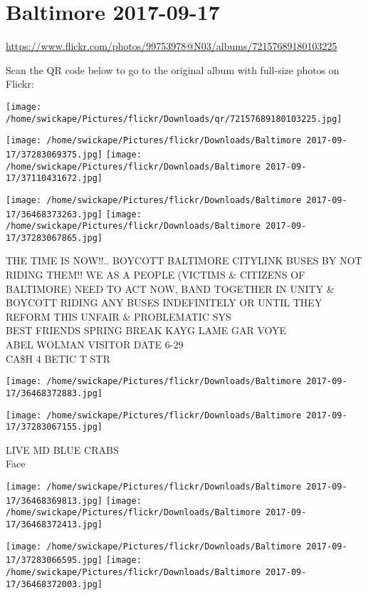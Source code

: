 \documentclass[10pt,letterpaper]{article}
\begin{document}
\section*{Baltimore 2017-09-17}

\url{https://www.flickr.com/photos/99753978@N03/albums/72157689180103225}

Scan the QR code below to go to the original album with full-size photos on Flickr:

\texttt{[image: /home/swickape/Pictures/flickr/Downloads/qr/72157689180103225.jpg]}
\pagebreak

\texttt{[image: /home/swickape/Pictures/flickr/Downloads/Baltimore 2017-09-17/37283069375.jpg]}
\texttt{[image: /home/swickape/Pictures/flickr/Downloads/Baltimore 2017-09-17/37110431672.jpg]}

\texttt{[image: /home/swickape/Pictures/flickr/Downloads/Baltimore 2017-09-17/36468373263.jpg]}
\texttt{[image: /home/swickape/Pictures/flickr/Downloads/Baltimore 2017-09-17/37283067865.jpg]}

THE TIME IS NOW!!..  BOYCOTT BALTIMORE CITYLINK BUSES BY NOT RIDING THEM!!  WE AS A PEOPLE (VICTIMS \& CITIZENS OF BALTIMORE) NEED TO ACT NOW, BAND TOGETHER IN UNITY \& BOYCOTT RIDING ANY BUSES INDEFINITELY OR UNTIL THEY REFORM THIS UNFAIR \& PROBLEMATIC SYS\\
BEST FRIENDS SPRING BREAK KAYG LAME GAR VOYE\\
ABEL WOLMAN VISITOR DATE 6{-}29\\
CA\$H 4 BETIC T STR
\pagebreak

\texttt{[image: /home/swickape/Pictures/flickr/Downloads/Baltimore 2017-09-17/36468372883.jpg]}

\vspace{0.25in}
\texttt{[image: /home/swickape/Pictures/flickr/Downloads/Baltimore 2017-09-17/37283067155.jpg]}

LIVE MD BLUE CRABS\\
Face
\pagebreak

\texttt{[image: /home/swickape/Pictures/flickr/Downloads/Baltimore 2017-09-17/36468369813.jpg]}
\texttt{[image: /home/swickape/Pictures/flickr/Downloads/Baltimore 2017-09-17/36468372413.jpg]}

\texttt{[image: /home/swickape/Pictures/flickr/Downloads/Baltimore 2017-09-17/37283066595.jpg]}
\texttt{[image: /home/swickape/Pictures/flickr/Downloads/Baltimore 2017-09-17/36468372003.jpg]}
\end{document}
